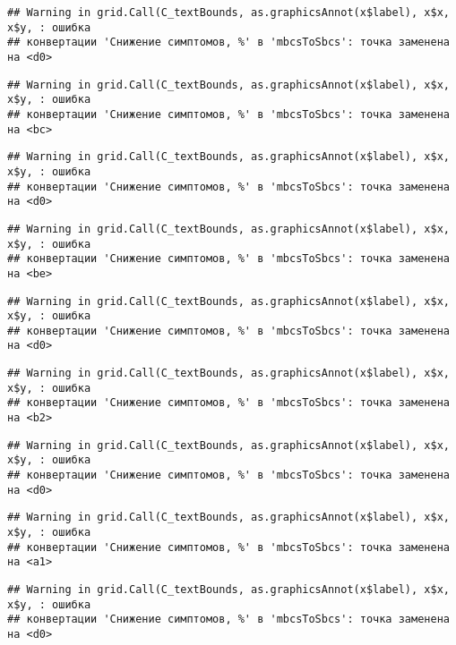 \documentclass[
]{article}
\begin{document}
\begin{verbatim}
## Warning in grid.Call(C_textBounds, as.graphicsAnnot(x$label), x$x, x$y, : ошибка
## конвертации 'Снижение симптомов, %' в 'mbcsToSbcs': точка заменена на <d0>
\end{verbatim}

\begin{verbatim}
## Warning in grid.Call(C_textBounds, as.graphicsAnnot(x$label), x$x, x$y, : ошибка
## конвертации 'Снижение симптомов, %' в 'mbcsToSbcs': точка заменена на <bc>
\end{verbatim}

\begin{verbatim}
## Warning in grid.Call(C_textBounds, as.graphicsAnnot(x$label), x$x, x$y, : ошибка
## конвертации 'Снижение симптомов, %' в 'mbcsToSbcs': точка заменена на <d0>
\end{verbatim}

\begin{verbatim}
## Warning in grid.Call(C_textBounds, as.graphicsAnnot(x$label), x$x, x$y, : ошибка
## конвертации 'Снижение симптомов, %' в 'mbcsToSbcs': точка заменена на <be>
\end{verbatim}

\begin{verbatim}
## Warning in grid.Call(C_textBounds, as.graphicsAnnot(x$label), x$x, x$y, : ошибка
## конвертации 'Снижение симптомов, %' в 'mbcsToSbcs': точка заменена на <d0>
\end{verbatim}

\begin{verbatim}
## Warning in grid.Call(C_textBounds, as.graphicsAnnot(x$label), x$x, x$y, : ошибка
## конвертации 'Снижение симптомов, %' в 'mbcsToSbcs': точка заменена на <b2>
\end{verbatim}

\begin{verbatim}
## Warning in grid.Call(C_textBounds, as.graphicsAnnot(x$label), x$x, x$y, : ошибка
## конвертации 'Снижение симптомов, %' в 'mbcsToSbcs': точка заменена на <d0>
\end{verbatim}

\begin{verbatim}
## Warning in grid.Call(C_textBounds, as.graphicsAnnot(x$label), x$x, x$y, : ошибка
## конвертации 'Снижение симптомов, %' в 'mbcsToSbcs': точка заменена на <a1>
\end{verbatim}

\begin{verbatim}
## Warning in grid.Call(C_textBounds, as.graphicsAnnot(x$label), x$x, x$y, : ошибка
## конвертации 'Снижение симптомов, %' в 'mbcsToSbcs': точка заменена на <d0>
\end{verbatim}
\end{document}
